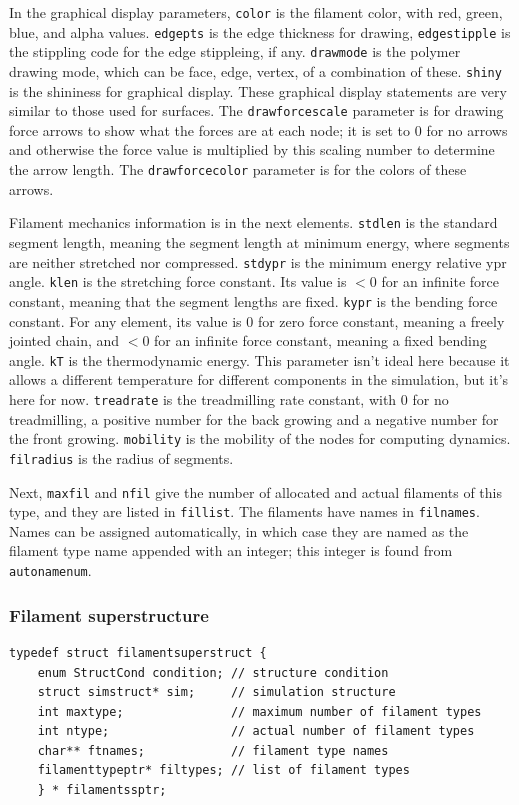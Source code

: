 \documentclass {scrbook}
\newcommand {\ttt} {\texttt}
\begin{document}
In the graphical display parameters, \ttt{color} is the filament color, with red, green, blue, and alpha values. \ttt{edgepts} is the edge thickness for drawing, \ttt{edgestipple} is the stippling code for the edge stippleing, if any. \ttt{drawmode} is the polymer drawing mode, which can be face, edge, vertex, of a combination of these. \ttt{shiny} is the shininess for graphical display. These graphical display statements are very similar to those used for surfaces. The \ttt{drawforcescale} parameter is for drawing force arrows to show what the forces are at each node; it is set to 0 for no arrows and otherwise the force value is multiplied by this scaling number to determine the arrow length. The \ttt{drawforcecolor} parameter is for the colors of these arrows.

Filament mechanics information is in the next elements. \ttt{stdlen} is the standard segment length, meaning the segment length at minimum energy, where segments are neither stretched nor compressed. \ttt{stdypr} is the minimum energy relative ypr angle. \ttt{klen} is the stretching force constant. Its value is $< 0$ for an infinite force constant, meaning that the segment lengths are fixed. \ttt{kypr} is the bending force constant. For any element, its value is 0 for zero force constant, meaning a freely jointed chain, and $< 0$ for an infinite force constant, meaning a fixed bending angle. \ttt{kT} is the thermodynamic energy. This parameter isn't ideal here because it allows a different temperature for different components in the simulation, but it's here for now. \ttt{treadrate} is the treadmilling rate constant, with 0 for no treadmilling, a positive number for the back growing and a negative number for the front growing. \ttt{mobility} is the mobility of the nodes for computing dynamics. \ttt{filradius} is the radius of segments.

Next, \ttt{maxfil} and \ttt{nfil} give the number of allocated and actual filaments of this type, and they are listed in \ttt{fillist}. The filaments have names in \ttt{filnames}. Names can be assigned automatically, in which case they are named as the filament type name appended with an integer; this integer is found from \ttt{autonamenum}.\\

\subsubsection{Filament superstructure}

\begin{lstlisting}
typedef struct filamentsuperstruct {
    enum StructCond condition; // structure condition
    struct simstruct* sim;     // simulation structure
    int maxtype;               // maximum number of filament types
    int ntype;                 // actual number of filament types
    char** ftnames;            // filament type names
    filamenttypeptr* filtypes; // list of filament types
    } * filamentssptr;
\end{lstlisting}
\end{document}
